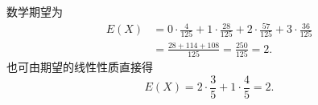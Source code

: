 \begin{answer}
数学期望为
\nopagebreak[4]
\[\begin{aligned}
E(X)&=0\cdot\frac4{125}+1\cdot\frac{28}{125}+2\cdot\frac{57}{125}+3\cdot\frac{36}{125}\\
&=\frac{28+114+108}{125}
=\frac{250}{125}=2.
\end{aligned}\]
也可由期望的线性性质直接得
\nopagebreak[4]
\[E(X)=2\cdot\frac35+1\cdot\frac45=2.\]



\end{answer}
